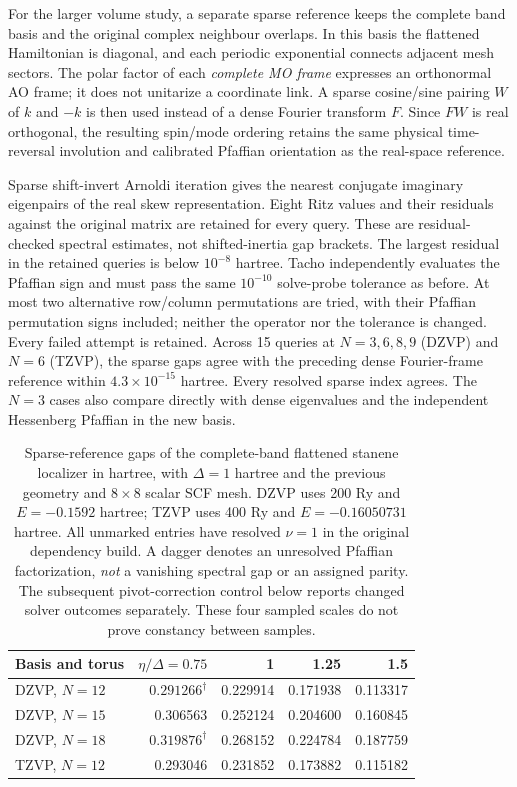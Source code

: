 \documentclass[11pt]{article}
\begin{document}
For the larger volume study, a separate sparse reference keeps
the complete band basis and the original complex neighbour
overlaps. In this basis the flattened Hamiltonian is diagonal,
and each periodic exponential connects adjacent mesh sectors.
The polar factor of each \emph{complete MO frame} expresses an
orthonormal AO frame; it does not unitarize a coordinate link.
A sparse cosine/sine pairing $W$ of $k$ and $-k$ is then used
instead of a dense Fourier transform $F$. Since $FW$ is real
orthogonal, the resulting spin/mode ordering retains the same
physical time-reversal involution and calibrated Pfaffian
orientation as the real-space reference.

Sparse shift-invert Arnoldi iteration gives the nearest conjugate
imaginary eigenpairs of the real skew representation. Eight
Ritz values and their residuals against the original matrix are
retained for every query. These are residual-checked spectral
estimates, not shifted-inertia gap brackets. The largest residual
in the retained queries is below $10^{-8}$ hartree.
Tacho independently evaluates the Pfaffian sign and must pass
the same $10^{-10}$ solve-probe tolerance as before. At most
two alternative row/column permutations are tried, with their
Pfaffian permutation signs included; neither the operator nor
the tolerance is changed. Every failed attempt is retained.
Across 15 queries at $N=3,6,8,9$ (DZVP) and $N=6$ (TZVP),
the sparse gaps agree with the preceding dense Fourier-frame
reference within $4.3\times10^{-15}$ hartree. Every resolved
sparse index agrees. The $N=3$ cases also compare directly with
dense eigenvalues and the independent Hessenberg Pfaffian in
the new basis.

\begin{table}[htbp]
\centering\small
\begin{tabular}{lrrrr}
\toprule
Basis and torus & $\eta/\Delta=0.75$ & 1 & 1.25 & 1.5\\
\midrule
DZVP, $N=12$ & $0.291266^{\dagger}$ & 0.229914 & 0.171938 & 0.113317\\
DZVP, $N=15$ & 0.306563 & 0.252124 & 0.204600 & 0.160845\\
DZVP, $N=18$ & $0.319876^{\dagger}$ & 0.268152 & 0.224784 & 0.187759\\
TZVP, $N=12$ & 0.293046 & 0.231852 & 0.173882 & 0.115182\\
\bottomrule
\end{tabular}
\caption{Sparse-reference gaps of the complete-band flattened
stanene localizer in hartree, with $\Delta=1$ hartree and the
previous geometry and $8\times8$ scalar SCF mesh. DZVP uses
200 Ry and $E=-0.1592$ hartree; TZVP uses 400 Ry and
$E=-0.16050731$ hartree. All unmarked entries have resolved
$\nu=1$ in the original dependency build. A dagger denotes an unresolved Pfaffian factorization,
\emph{not} a vanishing spectral gap or an assigned parity.
The subsequent pivot-correction control below reports changed solver outcomes
separately. These four sampled scales do not prove constancy between samples.}
\label{tab:si-stanene-large-torus}
\end{table}
\end{document}
